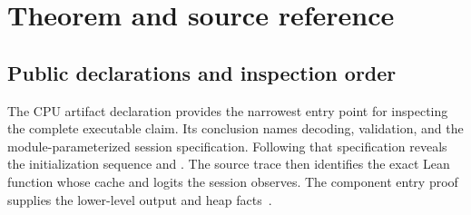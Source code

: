 \section{Theorem and source reference}
\label{sec:reference}

\subsection{Public declarations and inspection order}

The CPU artifact declaration provides the narrowest entry point for inspecting the complete executable claim.  Its conclusion names decoding, validation, and the module-parameterized session specification.  Following that specification reveals the initialization sequence and .  The source trace then identifies the exact Lean function whose cache and logits the session observes.  The component entry proof supplies the lower-level output and heap facts~\cite{artifact,session,entry}.


